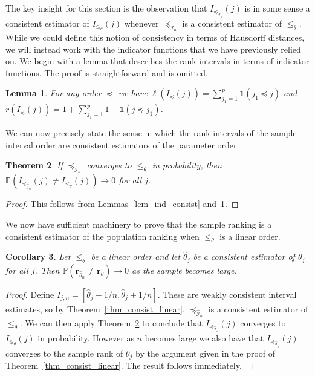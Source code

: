 \documentclass[12pt]{article}
\newcommand{\prob}[1]{\mathbb{P}(#1)}
\newcommand{\ind}[1]{\mathbf{1}(#1)}
\newcommand{\pord}{{\leqslant_{\theta}}}
\newcommand{\iordn}{{\preceq_{\hat{\mathcal{I}}_{n}}}}
\newcommand{\rankp}{{\mathbf{r}_\theta}}
\newcommand{\ranksn}{{\mathbf{r}_{\hat{\theta}_n}}}
\newtheorem{theorem}{Theorem}
\numberwithin{theorem}{section}
\newtheorem{lemma}[theorem]{Lemma}
\newtheorem{corollary}[theorem]{Corollary}
\begin{document}
The key insight for this section is the observation that $I_\iordn(j)$ is in some sense a consistent estimator of $I_\pord(j)$ whenever $\iordn$ is a consistent estimator of $\pord$.  While we could define this notion of consistency in terms of Hausdorff distances, we will instead work with the indicator functions that we have previously relied on.  We begin with a lemma that describes the rank intervals in terms of indicator functions.  The proof is straightforward and is omitted.

\begin{lemma}
\label{lem_rank_int_ind}
For any order $\preceq$ we have $\ell(I_\preceq(j)) = \sum_{j_1 = 1}^p \ind{j_1 \preceq j}$ and $r(I_\preceq(j)) = 1 + \sum_{j_1 = 1}^p 1 - \ind{j \preceq j_1}$.
\end{lemma}

We can now precisely state the sense in which the rank intervals of the sample interval order are consistent estimators of the parameter order.

\begin{theorem}
\label{thm_rank_int_consist}
If $\iordn$ converges to $\pord$ in probability, then $\prob{I_\iordn(j) \neq I_\pord(j)} \rightarrow 0$ for all $j$.
\end{theorem}
\begin{proof}
This follows from Lemmas~\ref{lem_ind_consist} and~\ref{lem_rank_int_ind}.
\end{proof}

We now have sufficient machinery to prove that the sample ranking is a consistent estimator of the population ranking when $\pord$ is a linear order.

\begin{corollary}
\label{cor_sample_ranks}
Let $\pord$ be a linear order and let $\hat{\theta}_j$ be a consistent estimator of $\theta_j$ for all $j$.  Then $\prob{\ranksn \neq \rankp} \rightarrow 0$ as the sample becomes large.
\end{corollary}
\begin{proof}
Define $\hat{I}_{j, n} = [\hat{\theta}_j - 1 / n, \hat{\theta}_j + 1 / n]$.  These are weakly consistent interval estimates, so by Theorem~\ref{thm_consist_linear}, $\iordn$ is a consistent estimator of $\pord$.  We can then apply Theorem~\ref{thm_rank_int_consist} to conclude that $I_\iordn(j)$ converges to $I_\pord(j)$ in probability.  However as $n$ becomes large we also have that $I_\iordn(j)$ converges to the sample rank of $\theta_j$ by the argument given in the proof of Theorem~\ref{thm_consist_linear}.  The result follows immediately.
\end{proof}
\end{document}
